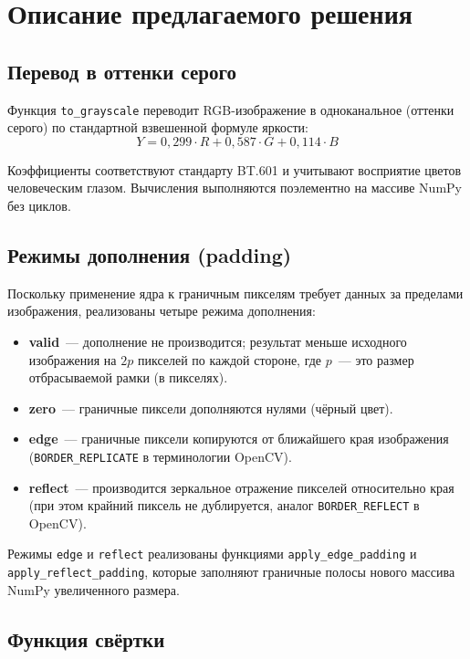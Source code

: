 \documentclass[a4paper]{article}
\begin{document}
\section{Описание предлагаемого решения}

\subsection{Перевод в оттенки серого}

Функция \verb|to_grayscale| переводит RGB-изображение в одноканальное (оттенки серого) по стандартной взвешенной формуле яркости:
\[
Y = 0{,}299 \cdot R + 0{,}587 \cdot G + 0{,}114 \cdot B
\]

Коэффициенты соответствуют стандарту BT.601 и учитывают восприятие цветов человеческим глазом. Вычисления выполняются поэлементно на массиве NumPy без циклов.

\subsection{Режимы дополнения (padding)}

Поскольку применение ядра к граничным пикселям требует данных за пределами изображения, реализованы четыре режима дополнения:

\begin{itemize}
    \item \textbf{valid}~--- дополнение не производится; результат меньше исходного изображения на \(2p\) пикселей по каждой стороне, где \(p\)~--- это размер отбрасываемой рамки (в пикселях).
    \item \textbf{zero}~--- граничные пиксели дополняются нулями (чёрный цвет).
    \item \textbf{edge}~--- граничные пиксели копируются от ближайшего края изображения (\verb|BORDER_REPLICATE| в терминологии OpenCV).
    \item \textbf{reflect}~--- производится зеркальное отражение пикселей относительно края (при этом крайний пиксель не дублируется, аналог \verb|BORDER_REFLECT| в OpenCV).
\end{itemize}

Режимы \verb|edge| и \verb|reflect| реализованы функциями \verb|apply_edge_padding| 
и \verb|apply_reflect_padding|, которые заполняют граничные полосы нового массива NumPy 
увеличенного размера.
\subsection{Функция свёртки}
\end{document}
